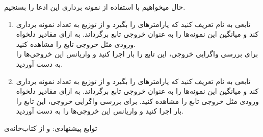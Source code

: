 \documentclass[a4paper]{article}
\begin{document}
حال میخواهیم با استفاده از نمونه برداری این ادعا را بسنجیم. 
\begin{enumerate}
	\item 
	تابعی به نام 
	تعریف کنید که پارامتر‌های 
	را بگیرد و از توزیع 
	به تعداد 
نمونه برداری کند و میانگین این نمونه‌ها را به عنوان خروجی تابع برگرداند. به ازای مقادیر دلخواه ورودی مثل 
	خروجی تابع را مشاهده کنید.
	\\
	 برای بررسی واگرایی خروجی، این تابع را 
	بار اجرا کنید و واریانس این خروجی‌‌ها را به دست آوردید.
	\item
	تابعی به نام 
	تعریف کنید که پارامتر‌های 
	را بگیرد و از توزیع 
	به تعداد 
	نمونه برداری کند و میانگین این نمونه‌ها را به عنوان خروجی تابع برگرداند. به ازای مقادیر دلخواه ورودی مثل 
	خروجی تابع را مشاهده کنید. برای بررسی واگرایی خروجی، این تابع را 
	بار اجرا کنید و واریانس این خروجی‌‌ها را به دست آوردید.
\end{enumerate}

توابع پیشنهادی:
و
از کتاب‌خانه‌ی 
\end{document}
